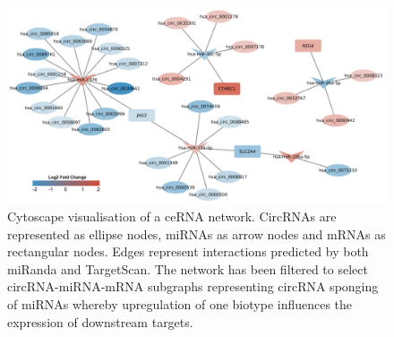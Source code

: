 \documentclass[pdflatex,sn-mathphys-num]{sn-jnl}
\begin{document}
\begin{figure}
    \begin{center}
        \includegraphics[width=\textwidth]{Figure3.png}
        \caption{Cytoscape visualisation of a ceRNA network. CircRNAs are represented as ellipse nodes, miRNAs as arrow nodes and mRNAs as rectangular nodes. Edges represent interactions predicted by both miRanda and TargetScan. The network has been filtered to select circRNA-miRNA-mRNA subgraphs representing circRNA sponging of miRNAs whereby upregulation of one biotype influences the expression of downstream targets.}
        \label{network}
    \end{center}
\end{figure}
\end{document}
